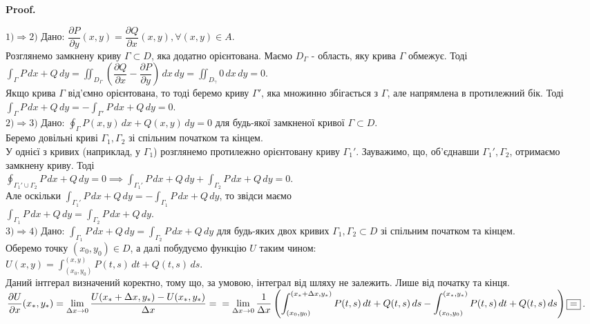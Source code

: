 \documentclass[a4paper, 10pt]{article}
\makeatletter
\def\departial#1#2{\dfrac{\partial {#1}}{\partial {#2}}}
\def\qed{$\blacksquare$}
\theoremstyle{theoremdd}
\theoremstyle{theoremdd}
\theoremstyle{theoremdd}
\theoremstyle{theoremdd}
\theoremstyle{theoremdd}
\theoremstyle{theoremdd}
\theoremstyle{theoremdd}
\theoremstyle{theoremdd}
\renewenvironment{proof}[1][Proof.\\]{\par
\pushQED{\hfill \qed}%
\normalfont \topsep6\p@\@plus6\p@\relax
\trivlist
\item\relax
{\bfseries
#1\@addpunct{.}}\hspace\labelsep\ignorespaces
}{%
\popQED\endtrivlist\@endpefalse
}
\makeatother
\begin{document}
\begin{proof}
$\boxed{1) \Rightarrow 2)}$ Дано: $\departial{P}{y}(x,y) = \departial{Q}{x}(x,y), \forall (x,y) \in A$.\\
Розглянемо замкнену криву $\Gamma \subset D$, яка додатно орієнтована. Маємо $D_{\Gamma}$ - область, яку крива $\Gamma$ обмежує. Тоді\\
$\displaystyle\int_{\Gamma} P\,dx + Q\,dy = \iint_{D_\Gamma} \left( \departial{Q}{x} - \departial{P}{y} \right)\,dx\,dy = \iint_{D_\gamma} 0\,dx\,dy = 0$.\\
Якщо крива $\Gamma$ від'ємно орієнтована, то тоді беремо криву $\Gamma'$, яка множинно збігається з $\Gamma$, але напрямлена в протилежний бік. Тоді\\
$\displaystyle\int_{\Gamma} P\,dx + Q\,dy = -\int_{\Gamma'} P\,dx + Q\,dy = 0$.
\bigskip \\
$\boxed{2) \Rightarrow 3)}$ Дано: $\displaystyle\oint_{\Gamma} P(x,y)\,dx + Q(x,y)\,dy = 0$ для будь-якої замкненої кривої $\Gamma \subset D$.\\
Беремо довільні криві $\Gamma_1,\Gamma_2$ зі спільним початком та кінцем.\\
У однієї з кривих (наприклад, у $\Gamma_1$) розглянемо протилежно орієнтовану криву $\Gamma_1'$. Зауважимо, що, об'єднавши $\Gamma_1', \Gamma_2$, отримаємо замкнену криву. Тоді\\
$\displaystyle\oint_{\Gamma_1' \cup \Gamma_2} P\,dx+Q\,dy = 0 \implies \int_{\Gamma_1'} P\,dx + Q\,dy + \int_{\Gamma_2} P\,dx + Q\,dy = 0$.\\
Але оскільки $\displaystyle \int_{\Gamma_1'} P\,dx + Q\,dy = -\int_{\Gamma_1} P\,dx + Q\,dy$, то звідси маємо\\
$\displaystyle\int_{\Gamma_1} P\,dx + Q\,dy = \int_{\Gamma_2} P\,dx + Q\,dy$.
\bigskip \\
$\boxed{3) \Rightarrow 4)}$ Дано: $\displaystyle\int_{\Gamma_1} P\,dx + Q\,dy = \int_{\Gamma_2} P\,dx + Q\,dy$ для будь-яких двох кривих $\Gamma_1, \Gamma_2 \subset D$ зі спільним початком та кінцем.\\
Оберемо точку $(x_0,y_0) \in D$, а далі побудуємо функцію $U$ таким чином:\\
$U(x,y) = \displaystyle\int_{(x_0,y_0)}^{(x,y)} P(t,s)\,dt + Q(t,s)\,ds$.\\
Даний інтгерал визначений коректно, тому що, за умовою, інтеграл від шляху не залежить. Лише від початку та кінця.\\
$\departial{U}{x}(x_*,y_*) = \displaystyle\lim_{\Delta x \to 0} \dfrac{U(x_*+\Delta x, y_*) - U(x_*,y_*)}{\Delta x} = \\ = \lim_{\Delta x \to 0} \dfrac{1}{\Delta x} \left( \int_{(x_0,y_0)}^{(x_* + \Delta x,y_*)} P(t,s)\,dt + Q(t,s)\,ds -\int_{(x_0,y_0)}^{(x_*,y_*)} P(t,s)\,dt + Q(t,s)\,ds \right) \boxed{=}$.\\

\end{proof}
\end{document}
